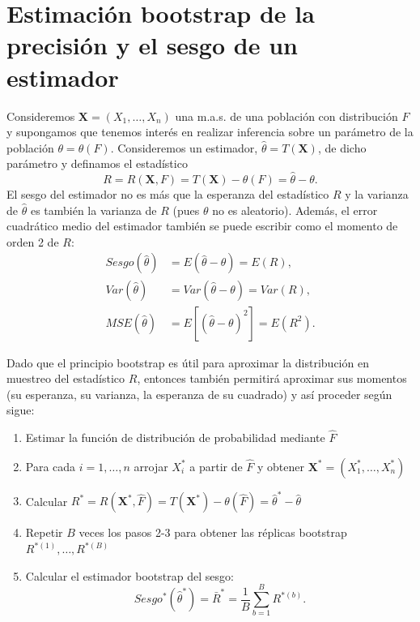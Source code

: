 \documentclass[]{book}
\theoremstyle{definition}
\theoremstyle{definition}
\theoremstyle{definition}
\theoremstyle{remark}
\begin{document}
\section{Estimación bootstrap de la precisión y el sesgo de un
estimador}\label{cap2-boot}

Consideremos \(\mathbf{X}=\left( X_1,\ldots ,X_n \right)\) una m.a.s. de
una población con distribución \(F\) y supongamos que tenemos interés en
realizar inferencia sobre un parámetro de la población
\(\theta =\theta \left( F \right)\). Consideremos un estimador,
\(\hat{\theta}=T\left( \mathbf{X} \right)\), de dicho parámetro y
definamos el estadístico
\[R=R\left( \mathbf{X}, F \right) = T\left( \mathbf{X} \right) 
- \theta \left( F \right) = \hat{\theta} - \theta.\] El sesgo del
estimador no es más que la esperanza del estadístico \(R\) y la varianza
de \(\hat{\theta}\) es también la varianza de \(R\) (pues \(\theta\) no
es aleatorio). Además, el error cuadrático medio del estimador también
se puede escribir como el momento de orden 2 de \(R\): \[\begin{aligned}
Sesgo\left( \hat{\theta} \right) &= E\left( \hat{\theta}-\theta \right)
=E\left( R \right), \\
Var\left( \hat{\theta} \right) &= Var\left( \hat{\theta}-\theta \right)
=Var\left( R \right), \\
MSE\left( \hat{\theta} \right) &= E\left[ \left( \hat{\theta}-\theta \right)
^2\right] =E\left( R^2 \right).
\end{aligned}\]

Dado que el principio bootstrap es útil para aproximar la distribución
en muestreo del estadístico \(R\), entonces también permitirá aproximar
sus momentos (su esperanza, su varianza, la esperanza de su cuadrado) y
así proceder según sigue:

\begin{enumerate}
\def\labelenumi{\arabic{enumi}.}
\item
  Estimar la función de distribución de probabilidad mediante
  \(\hat{F}\)
\item
  Para cada \(i=1,\ldots ,n\) arrojar \(X_i^{\ast}\) a partir de
  \(\hat{F}\) y obtener
  \(\mathbf{X}^{\ast}=\left( X_1^{\ast}, \ldots ,X_n^{\ast} \right)\)
\item
  Calcular
  \(R^{\ast}=R\left( \mathbf{X}^{\ast},\hat{F} \right) =T\left( \mathbf{X}^{\ast} \right) -\theta \left( \hat{F} \right) = \hat{\theta}^{\ast}- \hat \theta\)
\item
  Repetir \(B\) veces los pasos 2-3 para obtener las réplicas bootstrap
  \(R^{\ast (1)}, \ldots, R^{\ast (B)}\)
\item
  Calcular el estimador bootstrap del sesgo:
  \[Sesgo^{\ast}\left( \hat{\theta}^{\ast} \right) =\bar{R}^{\ast}=\frac{1
  }{B}\sum_{b=1}^{B}R^{\ast (b)}.\]
\end{enumerate}
\end{document}
